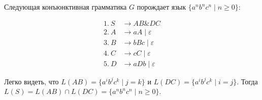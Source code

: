 \begin{example}
    Следующая конъюнктивная грамматика $G$ порождает язык $\{a^nb^nc^n\mid n \geq 0\}$:

    \begin{align*}
    1.\ S   &\to A B \& D C \\
    2.\ A  &\to a A \mid \varepsilon \\
    3.\ B &\to b B c \mid \varepsilon \\
    4.\ C   &\to c C \mid \varepsilon \\
    5.\ D   &\to aDb \mid \varepsilon
    \end{align*}

    Легко видеть, что $L(AB) = \{a^ib^jc^k\mid j = k\}$ и $L(DC) = \{a^ib^jc^k\mid i = j\}$. Тогда $L(S) = L(AB) \cap L(DC) = \{a^nb^nc^n\mid n \geq 0\}$.


\end{example}
